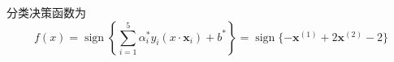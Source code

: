 \documentclass{article}
\DeclareMathOperator{\sign}{sign}
\begin{document}
分类决策函数为
\begin{equation*}
    f(x) = \sign{\left\{\sum_{i = 1}^{5}{\alpha^*_i y_i (x \cdot \boldsymbol{x}_i)} + b^* \right\}} = \sign{\{ -\boldsymbol{x}^{(1)} + 2\boldsymbol{x}^{(2)} - 2\}}
\end{equation*}
\end{document}
